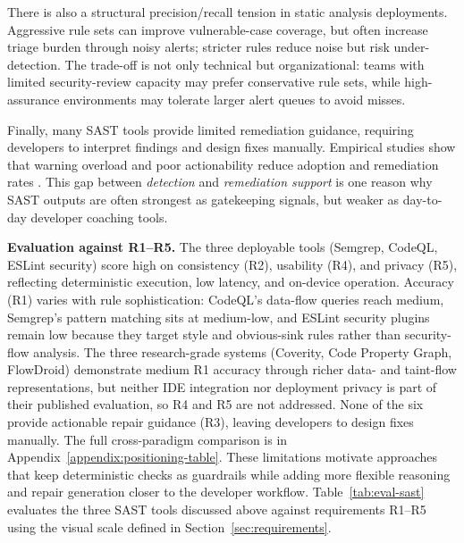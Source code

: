 There is also a structural precision/recall tension in static analysis deployments. Aggressive rule sets can improve vulnerable-case coverage, but often increase triage burden through noisy alerts; stricter rules reduce noise but risk under-detection. The trade-off is not only technical but organizational: teams with limited security-review capacity may prefer conservative rule sets, while high-assurance environments may tolerate larger alert queues to avoid misses.

Finally, many SAST tools provide limited remediation guidance, requiring developers to interpret findings and design fixes manually. Empirical studies show that warning overload and poor actionability reduce adoption and remediation rates \cite{johnson2013don,christakis2016developers}. This gap between \emph{detection} and \emph{remediation support} is one reason why SAST outputs are often strongest as gatekeeping signals, but weaker as day-to-day developer coaching tools.

\label{subsubsec:eval-sast}%
\noindent\textbf{Evaluation against R1--R5.} The three deployable tools (Semgrep, CodeQL, ESLint security) score high on consistency (R2), usability (R4), and privacy (R5), reflecting deterministic execution, low latency, and on-device operation. Accuracy (R1) varies with rule sophistication: CodeQL's data-flow queries reach medium, Semgrep's pattern matching sits at medium-low, and ESLint security plugins remain low because they target style and obvious-sink rules rather than security-flow analysis. The three research-grade systems (Coverity, Code Property Graph, FlowDroid) demonstrate medium R1 accuracy through richer data- and taint-flow representations, but neither IDE integration nor deployment privacy is part of their published evaluation, so R4 and R5 are not addressed. None of the six provide actionable repair guidance (R3), leaving developers to design fixes manually. The full cross-paradigm comparison is in Appendix~\ref{appendix:positioning-table}. These limitations motivate approaches that keep deterministic checks as guardrails while adding more flexible reasoning and repair generation closer to the developer workflow. Table~\ref{tab:eval-sast} evaluates the three SAST tools discussed above against requirements R1--R5 using the visual scale defined in Section~\ref{sec:requirements}.

